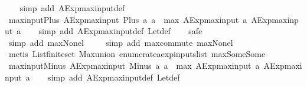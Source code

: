 \begin{isabellebody}
%
\isadelimproof
\ \ %
\endisadelimproof
%
\isatagproof
{}\isamarkupfalse%
\ {\isacharparenleft}simp\ add{\isacharcolon}\ AExp{\isachardot}max{\isacharunderscore}input{\isacharunderscore}def{\isacharparenright}%
\endisatagproof
{\isafoldproof}%
%
\isadelimproof
\isanewline
%
\endisadelimproof
\isanewline
{}\isamarkupfalse%
\ max{\isacharunderscore}input{\isacharunderscore}Plus{\isacharcolon}\ {\isachardoublequoteopen}AExp{\isachardot}max{\isacharunderscore}input\ {\isacharparenleft}Plus\ a{}\ a{}{\isacharparenright}\ {\isacharequal}\ max\ {\isacharparenleft}AExp{\isachardot}max{\isacharunderscore}input\ a{}{\isacharparenright}\ {\isacharparenleft}AExp{\isachardot}max{\isacharunderscore}input\ a{}{\isacharparenright}{\isachardoublequoteclose}\isanewline
%
\isadelimproof
\ \ %
\endisadelimproof
%
\isatagproof
{}\isamarkupfalse%
\ {\isacharparenleft}simp\ add{\isacharcolon}\ AExp{\isachardot}max{\isacharunderscore}input{\isacharunderscore}def\ Let{\isacharunderscore}def{\isacharparenright}\isanewline
\ \ \isamarkupfalse%
\ safe\isanewline
\ \ \ \ \isamarkupfalse%
\ {\isacharparenleft}simp\ add{\isacharcolon}\ max{\isacharunderscore}None{\isacharunderscore}l{\isacharparenright}\isanewline
\ \ \ \isamarkupfalse%
\ {\isacharparenleft}simp\ add{\isacharcolon}\ max{\isachardot}commute\ max{\isacharunderscore}None{\isacharunderscore}l{\isacharparenright}\isanewline
\ \ \isamarkupfalse%
\ {\isacharparenleft}metis\ List{\isachardot}finite{\isacharunderscore}set\ Max{\isachardot}union\ enumerate{\isacharunderscore}aexp{\isacharunderscore}inputs{\isacharunderscore}list\ max{\isacharunderscore}Some{\isacharunderscore}Some{\isacharparenright}%
\endisatagproof
{\isafoldproof}%
%
\isadelimproof
\isanewline
%
\endisadelimproof
\isanewline
{}\isamarkupfalse%
\ max{\isacharunderscore}input{\isacharunderscore}Minus{\isacharcolon}\ {\isachardoublequoteopen}AExp{\isachardot}max{\isacharunderscore}input\ {\isacharparenleft}Minus\ a{}\ a{}{\isacharparenright}\ {\isacharequal}\ max\ {\isacharparenleft}AExp{\isachardot}max{\isacharunderscore}input\ a{}{\isacharparenright}\ {\isacharparenleft}AExp{\isachardot}max{\isacharunderscore}input\ a{}{\isacharparenright}{\isachardoublequoteclose}\isanewline
%
\isadelimproof
\ \ %
\endisadelimproof
%
\isatagproof
{}\isamarkupfalse%
\ {\isacharparenleft}simp\ add{\isacharcolon}\ AExp{\isachardot}max{\isacharunderscore}input{\isacharunderscore}def\ Let{\isacharunderscore}def{\isacharparenright}\isanewline

\end{isabellebody}
